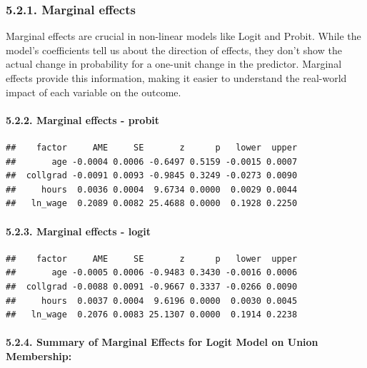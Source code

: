 \documentclass[
]{article}
\begin{document}
\hypertarget{marginal-effects}{%
\subsubsection{5.2.1. Marginal effects}\label{marginal-effects}}

Marginal effects are crucial in non-linear models like Logit and Probit.
While the model's coefficients tell us about the direction of effects,
they don't show the actual change in probability for a one-unit change
in the predictor. Marginal effects provide this information, making it
easier to understand the real-world impact of each variable on the
outcome.

\hypertarget{marginal-effects---probit}{%
\paragraph{5.2.2. Marginal effects -
probit}\label{marginal-effects---probit}}

\begin{verbatim}
##    factor     AME     SE       z      p   lower  upper
##       age -0.0004 0.0006 -0.6497 0.5159 -0.0015 0.0007
##  collgrad -0.0091 0.0093 -0.9845 0.3249 -0.0273 0.0090
##     hours  0.0036 0.0004  9.6734 0.0000  0.0029 0.0044
##   ln_wage  0.2089 0.0082 25.4688 0.0000  0.1928 0.2250
\end{verbatim}

\hypertarget{marginal-effects---logit}{%
\paragraph{5.2.3. Marginal effects -
logit}\label{marginal-effects---logit}}

\begin{verbatim}
##    factor     AME     SE       z      p   lower  upper
##       age -0.0005 0.0006 -0.9483 0.3430 -0.0016 0.0006
##  collgrad -0.0088 0.0091 -0.9667 0.3337 -0.0266 0.0090
##     hours  0.0037 0.0004  9.6196 0.0000  0.0030 0.0045
##   ln_wage  0.2076 0.0083 25.1307 0.0000  0.1914 0.2238
\end{verbatim}

\hypertarget{summary-of-marginal-effects-for-logit-model-on-union-membership}{%
\paragraph{5.2.4. Summary of Marginal Effects for Logit Model on Union
Membership:}\label{summary-of-marginal-effects-for-logit-model-on-union-membership}}
\end{document}
